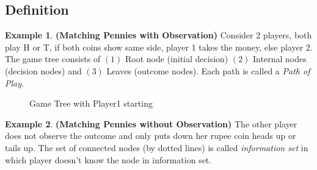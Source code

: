 \documentclass{article}
\theoremstyle{definition}
\newtheorem{example}{Example}[section]
\begin{document}
\subsection{Definition}
\begin{example}
\textbf{(Matching Pennies with Observation)}
Consider 2 players, both play H or T, if both coins show same side, player 1 takes the money, else player 2. The game tree consists of $(1)$ Root node (initial decision) $(2)$ Internal nodes (decision nodes) and $(3)$ Leaves (outcome nodes). Each path is called a \textit{Path of Play}.
\end{example} 
\begin{figure}[H]\hspace*{\fill}%
\hspace*{\fill}%
\caption{Game Tree with Player1 starting}
\end{figure}
\begin{example}
\textbf{(Matching Pennies without Observation)} The other player does not observe the outcome and only puts down her rupee coin heads up or tails up. The set of connected nodes (by dotted lines) is called \textit{information set} in which player doesn't know the node in information set.
\end{example}
\end{document}
